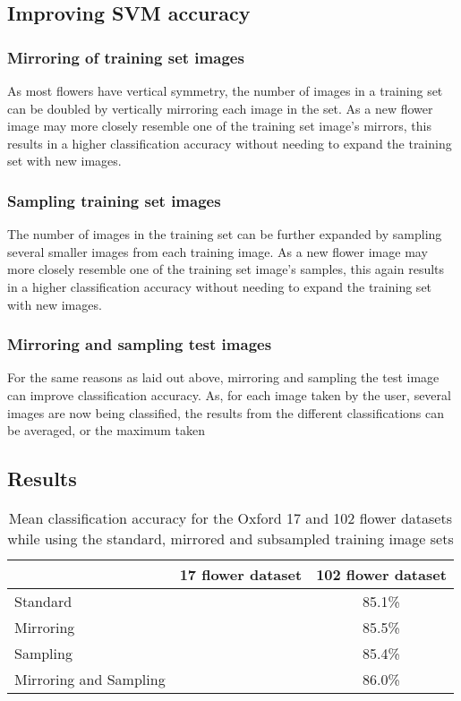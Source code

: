\documentclass[11pt, a4paper]{report}
\begin{document}
\subsection{Improving SVM accuracy}

\subsubsection{Mirroring of training set images}

As most flowers have vertical symmetry, the number of images in a training set can be doubled by vertically mirroring each image in the set. As a new flower image may more closely resemble one of the training set image's mirrors, this results in a higher classification accuracy without needing to expand the training set with new images.

\subsubsection{Sampling training set images}

The number of images in the training set can be further expanded by sampling several smaller images from each training image. As a new flower image may more closely resemble one of the training set image's samples, this again results in a higher classification accuracy without needing to expand the training set with new images.

\subsubsection{Mirroring and sampling test images}

For the same reasons as laid out above, mirroring and sampling the test image can improve classification accuracy. As, for each image taken by the user, several images are now being classified, the results from the different classifications can be averaged, or the maximum taken

\subsection{Results}


\begin{table}[h]
\centering 
\renewcommand{\arraystretch}{1.3}
\begin{tabular}{l|cc}
  & {\bf 17 flower dataset} & {\bf 102 flower dataset} \\
  \hline
  Standard & & 85.1\% \\
  Mirroring & & 85.5\% \\
  Sampling & & 85.4\% \\
  Mirroring and Sampling & & 86.0\% 
\end{tabular}
\renewcommand{\arraystretch}{1}
\caption{Mean classification accuracy for the Oxford 17 and 102 flower datasets while using the standard, mirrored and subsampled training image sets}
\label{table:accuracy}
\end{table}
\end{document}
